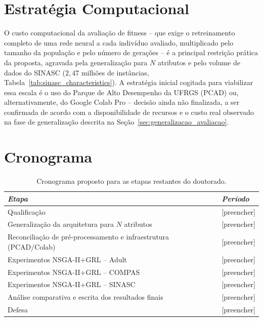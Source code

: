 \section{Estratégia Computacional}\label{sec:estrategia_computacional}

O custo computacional da avaliação de fitness -- que exige o retreinamento completo de uma rede neural a cada indivíduo avaliado, multiplicado pelo tamanho da população e pelo número de gerações -- é a principal restrição prática da proposta, agravada pela generalização para $N$ atributos e pelo volume de dados do SINASC ($2,47$ milhões de instâncias, Tabela~\ref{tab:sinasc_characteristics}). A estratégia inicial cogitada para viabilizar essa escala é o uso do Parque de Alto Desempenho da UFRGS (PCAD) ou, alternativamente, do Google Colab Pro -- decisão ainda não finalizada, a ser confirmada de acordo com a disponibilidade de recursos e o custo real observado na fase de generalização descrita na Seção~\ref{sec:generalizacao_avaliacao}.

\section{Cronograma}\label{sec:cronograma}


\begin{table}[H]
    \centering
    \caption{Cronograma proposto para as etapas restantes do doutorado.}
    \label{tab:cronograma}
    \begin{tabular}{l|l}
        \hline
        \textit{Etapa} & \textit{Período} \\
        \hline
        Qualificação & [preencher] \\
        Generalização da arquitetura para $N$ atributos & [preencher] \\
        Reconciliação de pré-processamento e infraestrutura (PCAD/Colab) & [preencher] \\
        Experimentos NSGA-II+GRL -- Adult & [preencher] \\
        Experimentos NSGA-II+GRL -- COMPAS & [preencher] \\
        Experimentos NSGA-II+GRL -- SINASC & [preencher] \\
        Análise comparativa e escrita dos resultados finais & [preencher] \\
        Defesa & [preencher] \\
        \hline
    \end{tabular}
\end{table}
